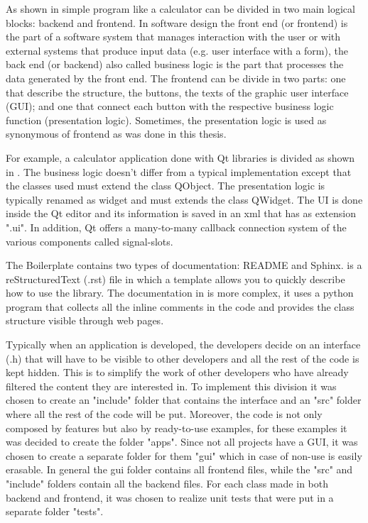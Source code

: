 As shown in  simple program like a calculator can be divided in two main logical blocks: backend and frontend.
In software design the front end (or frontend) is the part of a software system that manages interaction with the user or with external systems that produce input data (e.g. user interface with a form), the back end (or backend) also called business logic is the part that processes the data generated by the front end. The frontend can be divide in two parts: one that describe the structure, the buttons, the texts of the graphic user interface (GUI); and one that connect each button with the respective business logic function (presentation logic). Sometimes, the presentation logic is used as synonymous of frontend as was done in this thesis.

For example, a calculator application done with Qt libraries is divided as shown in . The business logic doesn't differ from a typical implementation except that the classes used must extend the class QObject. The presentation logic is typically renamed as widget and must extends the class QWidget. The UI is done inside the Qt editor and its information is saved in an xml that has as extension ".ui". In addition, Qt offers a many-to-many callback connection system of the various components called signal-slots.


The Boilerplate contains two types of documentation: README and Sphinx.
 is a reStructuredText (.rst) file in which a template allows you to quickly describe how to use the library.
The documentation in  is more complex, it uses a python program that collects all the inline comments in the code and provides the class structure visible through web pages.

Typically when an application is developed, the developers decide on an interface (.h) that will have to be visible to other developers and all the rest of the code is kept hidden. This is to simplify the work of other developers who have already filtered the content they are interested in.
To implement this division it was chosen to create an "include" folder that contains the interface and an "src" folder where all the rest of the code will be put.
Moreover, the code is not only composed by features but also by ready-to-use examples, for these examples it was decided to create the folder "apps".
Since not all projects have a GUI, it was chosen to create a separate folder for them "gui" which in case of non-use is easily erasable.
In general the gui folder contains all frontend files, while the "src" and "include" folders contain all the backend files.
For each class made in both backend and frontend, it was chosen to realize unit tests that were put in a separate folder "tests".

